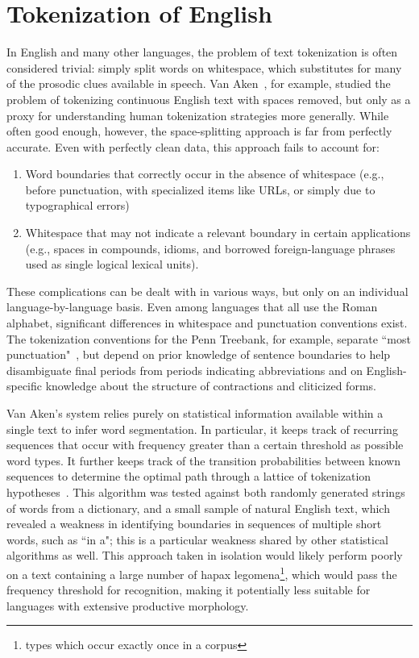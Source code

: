 \section{Tokenization of English}
In English and many other languages, the problem of text tokenization is often considered trivial: simply split words on whitespace, which substitutes for many of the prosodic clues available in speech. Van Aken~\cite{aken11}, for example, studied the problem of tokenizing continuous English text with spaces removed, but only as a proxy for understanding human tokenization strategies more generally. While often good enough, however, the space-splitting approach is far from perfectly accurate. Even with perfectly clean data, this approach fails to account for:
\begin{enumerate}
	\item Word boundaries that correctly occur in the absence of whitespace (e.g., before punctuation, with specialized items like URLs, or simply due to typographical errors)
	\item Whitespace that may not indicate a relevant boundary in certain applications (e.g., spaces in compounds, idioms, and borrowed foreign-language phrases used as single logical lexical units).
\end{enumerate}
These complications can be dealt with in various ways, but only on an individual language-by-language basis. Even among languages that all use the Roman alphabet, significant differences in whitespace and punctuation conventions exist. The tokenization conventions for the Penn Treebank, for example, separate ``most punctuation"~\cite{treebank}, but depend on prior knowledge of sentence boundaries to help disambiguate final periods from periods indicating abbreviations and on English-specific knowledge about the structure of contractions and cliticized forms.

Van Aken's system relies purely on statistical information available within a single text to infer word segmentation. In particular, it keeps track of recurring sequences that occur with frequency greater than a certain threshold as possible word types. It further keeps track of the transition probabilities between known sequences to determine the optimal path through a lattice of tokenization hypotheses~\cite{aken11}. This algorithm was tested against both randomly generated strings of words from a dictionary, and a small sample of natural English text, which revealed a weakness in identifying boundaries in sequences of multiple short words, such as ``in a"; this is a particular weakness shared by other statistical algorithms as well. This approach taken in isolation would likely perform poorly on a text containing a large number of hapax legomena\footnote{types which occur exactly once in a corpus}, which would pass the frequency threshold for recognition, making it potentially less suitable for languages with extensive productive morphology.

